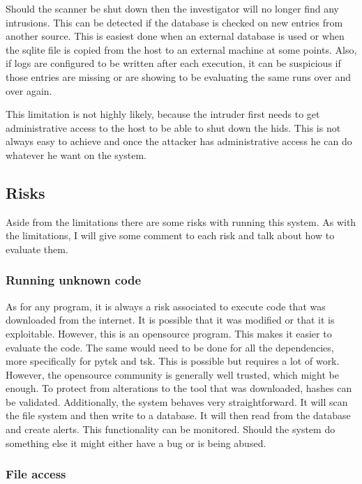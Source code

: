 \documentclass[
	a4paper,					%
	10pt,							%
	twoside,					%
	openright,				%
	notitlepage,			%
	parskip=half,			%
]{scrreprt}					%
\begin{document}
Should the scanner be shut down then the investigator will no longer find any intrusions. This can be detected if the database is checked on new entries from another source. This is easiest done when an external database is used or when the sqlite file is copied from the host to an external machine at some points. Also, if logs are configured to be written after each execution, it can be suspicious if those entries are missing or are showing to be evaluating the same runs over and over again. 

This limitation is not highly likely, because the intruder first needs to get administrative access to the host to be able to shut down the \gls{hids}. This is not always easy to achieve and once the attacker has administrative access he can do whatever he want on the system. 

\subsection{Risks}
\label{sec:risk}

Aside from the limitations there are some risks with running this system. As with the limitations, I will give some comment to each risk and talk about how to evaluate them.

\subsubsection{Running unknown code}
\label{sec:risk:unknowncode}

As for any program, it is always a risk associated to execute code that was downloaded from the internet. It is possible that it was modified or that it is exploitable. However, this is an \gls{opensource} program. This makes it easier to evaluate the code. The same would need to be done for all the dependencies, more specifically for \gls{pytsk} and \gls{tsk}. This is possible but requires a lot of work. However, the \gls{opensource} community is generally well trusted, which might be enough. To protect from alterations to the tool that was downloaded, hashes can be validated. Additionally, the system behaves very straightforward. It will scan the file system and then write to a database. It will then read from the database and create alerts. This functionality can be monitored. Should the system do something else it might either have a bug or is being abused.

\subsubsection{File access}
\label{sec:risk:file}
\end{document}
